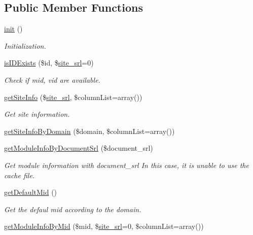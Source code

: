 \subsection*{Public Member Functions}
\begin{DoxyCompactItemize}
\item 
\hyperlink{classmoduleModel_a1d6fb4cdd3dd5e068e71cacc551f517c}{init} ()
\begin{DoxyCompactList}\small\item\em Initialization. \end{DoxyCompactList}\item 
\hyperlink{classmoduleModel_a5f53ae1101876e8967cc3c40e54badcd}{is\+I\+D\+Exists} (\$id, \$\hyperlink{ko_8install_8php_a8b1406b4ad1048041558dce6bfe89004}{site\+\_\+srl}=0)
\begin{DoxyCompactList}\small\item\em Check if mid, vid are available. \end{DoxyCompactList}\item 
\hyperlink{classmoduleModel_a96446e3b8e031ec1264c7187cb1384a5}{get\+Site\+Info} (\$\hyperlink{ko_8install_8php_a8b1406b4ad1048041558dce6bfe89004}{site\+\_\+srl}, \$column\+List=array())
\begin{DoxyCompactList}\small\item\em Get site information. \end{DoxyCompactList}\item 
\hyperlink{classmoduleModel_a6c4e1496c55c3c15507bb9532cb01c7f}{get\+Site\+Info\+By\+Domain} (\$domain, \$column\+List=array())
\item 
\hyperlink{classmoduleModel_a6b3ba81393e32a934f7bff65f05663d5}{get\+Module\+Info\+By\+Document\+Srl} (\$document\+\_\+srl)
\begin{DoxyCompactList}\small\item\em Get module information with document\+\_\+srl In this case, it is unable to use the cache file. \end{DoxyCompactList}\item 
\hyperlink{classmoduleModel_ae76b5be74783d11b676b167ba2c63523}{get\+Default\+Mid} ()
\begin{DoxyCompactList}\small\item\em Get the defaul mid according to the domain. \end{DoxyCompactList}\item 
\hyperlink{classmoduleModel_a543ca661568188ef493ff138246de29c}{get\+Module\+Info\+By\+Mid} (\$mid, \$\hyperlink{ko_8install_8php_a8b1406b4ad1048041558dce6bfe89004}{site\+\_\+srl}=0, \$column\+List=array())

\end{DoxyCompactItemize}
